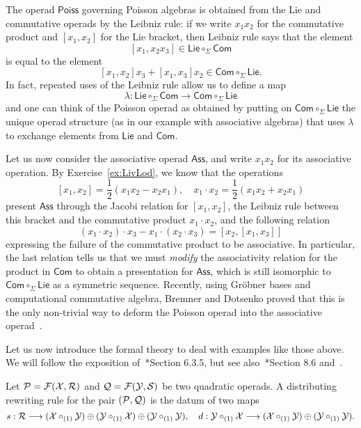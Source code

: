 \begin{example}
The operad $\mathsf{Poiss}$ governing
Poisson algebras is obtained from the
Lie and commutative operads by the Leibniz
rule: if we write $x_1x_2$ for the commutative
product and $[x_1,x_2]$ for the Lie bracket,
then Leibniz rule says that the element
\[
[x_1,x_2x_3] \in \mathsf{Lie}\circ_\Sigma\mathsf{Com}
\]
is equal to the element
\[
[x_1,x_2]x_3 + [x_1,x_3]x_2\in
\mathsf{Com}\circ_\Sigma\mathsf{Lie}.
\]
In fact, repeated uses of the Leibniz rule
allow us to define a map
\[\lambda : \mathsf{Lie}\circ_\Sigma\mathsf{Com}
\longrightarrow \mathsf{Com}\circ_\Sigma\mathsf{Lie}
\]
and one can think of the Poisson operad as
obtained by putting on $\mathsf{Com}\circ_\Sigma\mathsf{Lie}$ the unique operad
structure (as in our example with associative
algebras) that uses $\lambda$ to exchange 
elements from $\mathsf{Lie}$ and $\mathsf{Com}$.
\end{example}

\begin{example}
Let us now consider the associative operad
$\mathsf{Ass}$, and write $x_1x_2$ for its associative
operation. By Exercise~\ref{ex:LivLod}, we know
that the operations
\[ 
[x_1,x_2] = \frac{1}{2} (x_1x_2-x_2x_1),\quad
x_1\cdot x_2 = \frac{1}{2} (x_1x_2+x_2x_1)\]
present $\mathsf{Ass}$ 
through the Jacobi relation for $[x_1,x_2]$,
the Leibniz rule between this bracket and the
commutative product $x_1\cdot x_2$,
and the following relation 
\[
(x_1\cdot x_2)\cdot x_3 - 
x_1\cdot (x_2\cdot x_3) = [x_2,[x_1,x_3]]
\]
expressing the failure of the commutative
product to be associative. In particular,
the last relation tells us that we must
\emph{modify} the associativity relation
for the product in $\mathsf{Com}$ to 
obtain a presentation for $\mathsf{Ass}$,
which is still isomorphic to $\mathsf{Com}
\circ_\Sigma \mathsf{Lie}$ as a symmetric
sequence. Recently,
using Gr\"obner bases and computational commutative algebra,
Bremner and Dotsenko proved
that this is the only 
non-trivial way to deform the Poisson
operad into the associative operad~\cite{Bremner2020}.
\end{example}

Let us now introduce the formal theory to 
deal with examples like those above. We
will follow the exposition of~\cite{Bremner2016}*{Section 6.3.5}, but see also~\cite{Loday2012}*{Section 8.6} and~\cite{Dotsenko2014}.

\begin{definition}\label{def:distrule}
Let $\mathcal P = \mathcal{F}(\mathcal{X},\mathcal{R})$ and $\mathcal{Q} = \mathcal{F}(\mathcal{Y},\mathcal{S})$ be two quadratic operads. A
distributing rewriting rule for the
pair $(\mathcal P,\mathcal{Q})$ is the datum
of two maps 
\[
s : \mathcal{R} \longrightarrow (\mathcal{X}\circ_{(1)}\mathcal{Y})
				\oplus (\mathcal{Y}\circ_{(1)}\mathcal{X})
				\oplus (\mathcal{Y} \circ_{(1)}\mathcal{Y}),
				\quad
d : \mathcal{Y}\circ_{(1)} \mathcal{X} \longrightarrow
 	 (\mathcal{X}\circ_{(1)} \mathcal{Y})\oplus (\mathcal{Y}\circ_{(1)}
 	 \mathcal{Y}).
\]
\end{definition}

